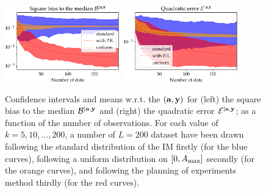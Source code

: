 \begin{figure}[h]
    \centering%
    \includegraphics[width=5cm]{figures/low-doe/errB.pdf}%
    \includegraphics[width=5cm]{figures/low-doe/errE.pdf}%
    \caption{Confidence intervals and means w.r.t.{ }the 
    $(\mathbf{a},\mathbf{y})$ for (left) the square bias to the median $\mathcal{B}^{|\mathbf{a},\mathbf{y}}$ and (right) the quadratic error $\mathcal{E}^{|\mathbf{a},\mathbf{y}}$; as a function of the number of observations. For each value of $k=5,10,\dots,200$, a number of $L=200$ dataset have been drawn following the standard distribution of the IM firstly (for the blue curves), {following a uniform distribution on $[0,A_{\rm max}]$ secondly (for the orange curves)}, and following the planning of experiments method thirdly (for the red curves). }
    \label{lowdoe:fig:errors}
\end{figure}


